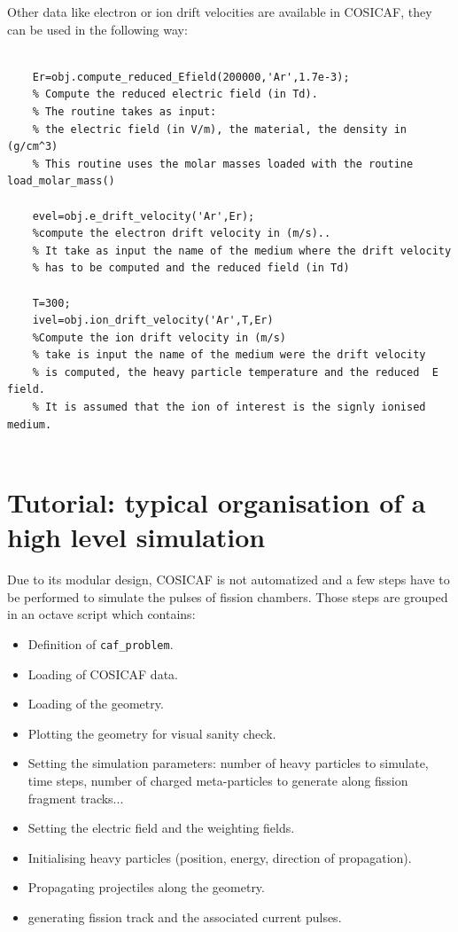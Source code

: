 \documentclass[10pt]{article}
\begin{document}
   Other data like electron or ion drift velocities are available in COSICAF, they can be used in the following way: 
	
	\begin{lstlisting}
	
	Er=obj.compute_reduced_Efield(200000,'Ar',1.7e-3);
	% Compute the reduced electric field (in Td).
	% The routine takes as input: 
	% the electric field (in V/m), the material, the density in (g/cm^3)
	% This routine uses the molar masses loaded with the routine  load_molar_mass()
	
	evel=obj.e_drift_velocity('Ar',Er);
	%compute the electron drift velocity in (m/s)..
	% It take as input the name of the medium where the drift velocity
	% has to be computed and the reduced field (in Td)
	
	T=300;
	ivel=obj.ion_drift_velocity('Ar',T,Er)
	%Compute the ion drift velocity in (m/s)
	% take is input the name of the medium were the drift velocity
	% is computed, the heavy particle temperature and the reduced  E field.
	% It is assumed that the ion of interest is the signly ionised medium.
	 
	\end{lstlisting}
	
	
	
	\section{Tutorial: typical organisation of a high level simulation}
	
   Due to its modular design, COSICAF is not automatized and a few steps have to be performed to simulate the pulses of fission chambers.
   Those steps are grouped in an octave script which contains:
   \begin{itemize}
   	\item Definition of \lstinline{caf_problem}.
   	\item Loading of COSICAF data.
   	\item Loading of the geometry.
   	\item Plotting the geometry for visual sanity check.
   	\item Setting the simulation parameters: number of heavy particles to simulate, time steps, number of charged meta-particles to generate along fission fragment tracks...
   	\item Setting the electric field and the weighting fields.
   	\item Initialising heavy particles (position, energy, direction of propagation).
   	\item Propagating projectiles along the geometry.
   	\item generating fission track and the associated current pulses.
   \end{itemize}
	
\end{document}
